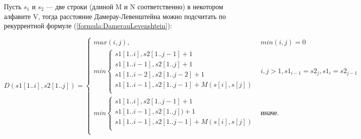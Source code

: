     Пусть $s_{1}$ и $s_{2}$ — две строки (длиной M и N соответственно) в некотором алфавите V,
    тогда расстояние Дамерау-Левенштейна можно подсчитать по рекуррентной формуле (\ref{formula:DamerauLevenshtein}):

    \begin{equation}\label{formula:DamerauLevenshtein}
        D(s1[1..i],s2[1..j]) = \left\{ \begin{array}{ll}
            max(i, j), & \textrm{$min(i, j) = 0$}\\

            min \left\{ \begin{array}{lll}
                s1[1..i], s2[1..j-1] + 1                 \\
                s1[1..i-1], s2[1..j] + 1                 \\
                s1[1..i-2], s2[1..j-2] + 1               \\
                s1[1..i-1],s2[1..j-1] + M(s[i], s[j])    \\
                \end{array} \right. & \textrm{$i, j > 1, s1_{i-1} = s2_j, s1_i = s2_{j-1}$}\\

            min \left\{ \begin{array}{lll}
                s1[1..i], s2[1..j-1]+ 1                  \\
                s1[1..i-1], s2[1..j]) + 1                \\
                s1[1..i-1],s2[1..j-1] + M(s[i], s[j])    \\
                \end{array} \right. & \textrm{иначе}.\\
        \end{array} \right.
    \end{equation}
\newpage